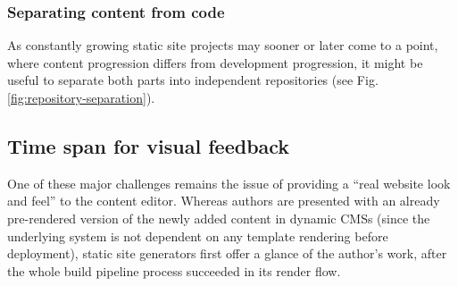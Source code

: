 \subsubsection{Separating content from code}
As constantly growing static site projects may sooner or later come to a point, where content progression differs from development progression, it might be useful to separate both parts into independent repositories (see Fig. \ref{fig:repository-separation}).


\subsection{Time span for visual feedback}
\label{sec:challenges-timespan}

One of these major challenges remains the issue of providing a ``real website look and feel'' to the content editor. Whereas authors are presented with an already pre-rendered version of the newly added content in dynamic CMSs (since the underlying system is not dependent on any template rendering before deployment), static site generators first offer a glance of the author's work, after the whole build pipeline process succeeded in its render flow.
